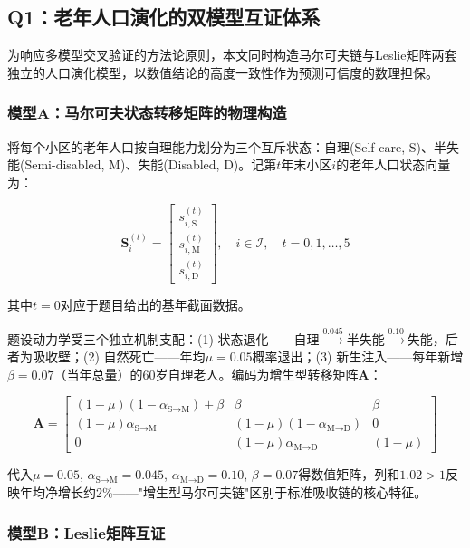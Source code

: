 \subsection{Q1：老年人口演化的双模型互证体系}

为响应多模型交叉验证的方法论原则，本文同时构造马尔可夫链与Leslie矩阵两套独立的人口演化模型，以数值结论的高度一致性作为预测可信度的数理担保。

\subsubsection{模型A：马尔可夫状态转移矩阵的物理构造}

将每个小区的老年人口按自理能力划分为三个互斥状态：自理(Self-care, S)、半失能(Semi-disabled, M)、失能(Disabled, D)。记第$t$年末小区$i$的老年人口状态向量为：

\begin{equation}
\mathbf{S}_i^{(t)} = \begin{bmatrix} s_{i,\text{S}}^{(t)} \\ s_{i,\text{M}}^{(t)} \\ s_{i,\text{D}}^{(t)} \end{bmatrix}, \quad i \in \mathcal{I}, \quad t = 0,1,\dots,5
\end{equation}

其中$t=0$对应于题目给出的基年截面数据。

题设动力学受三个独立机制支配：(1) 状态退化——自理$\xrightarrow{0.045}$半失能$\xrightarrow{0.10}$失能，后者为吸收壁；(2) 自然死亡——年均$\mu=0.05$概率退出；(3) 新生注入——每年新增$\beta=0.07$（当年总量）的60岁自理老人。编码为增生型转移矩阵$\mathbf{A}$：

\begin{equation}
\boxed{
\mathbf{A} =
\begin{bmatrix}
(1-\mu)(1-\alpha_{\text{S}\to\text{M}}) + \beta & \beta & \beta \\
(1-\mu)\alpha_{\text{S}\to\text{M}} & (1-\mu)(1-\alpha_{\text{M}\to\text{D}}) & 0 \\
0 & (1-\mu)\alpha_{\text{M}\to\text{D}} & (1-\mu)
\end{bmatrix}
}
\end{equation}

代入$\mu=0.05$, $\alpha_{\text{S}\to\text{M}}=0.045$, $\alpha_{\text{M}\to\text{D}}=0.10$, $\beta=0.07$得数值矩阵，列和$1.02>1$反映年均净增长约2\%——"增生型马尔可夫链"区别于标准吸收链的核心特征。

\subsubsection{模型B：Leslie矩阵互证}


